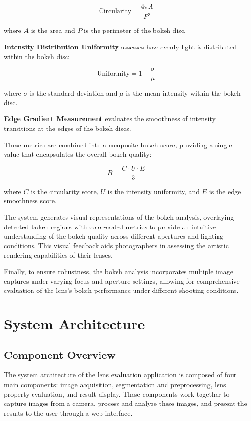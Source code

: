 \begin{equation}
\text{Circularity} = \frac{4\pi A}{P^2}
\end{equation}

where \( A \) is the area and \( P \) is the perimeter of the bokeh disc.

\textbf{Intensity Distribution Uniformity} assesses how evenly light is distributed within the bokeh disc:

\begin{equation}
\text{Uniformity} = 1 - \frac{\sigma}{\mu}
\end{equation}

where \( \sigma \) is the standard deviation and \( \mu \) is the mean intensity within the bokeh disc.

\textbf{Edge Gradient Measurement} evaluates the smoothness of intensity transitions at the edges of the bokeh discs.

These metrics are combined into a composite bokeh score, providing a single value that encapsulates the overall bokeh quality:

\begin{equation}
B = \frac{C \cdot U \cdot E}{3}
\end{equation}

where \( C \) is the circularity score, \( U \) is the intensity uniformity, and \( E \) is the edge smoothness score.

The system generates visual representations of the bokeh analysis, overlaying detected bokeh regions with color-coded metrics to provide an intuitive understanding of the bokeh quality across different apertures and lighting conditions. This visual feedback aids photographers in assessing the artistic rendering capabilities of their lenses.

Finally, to ensure robustness, the bokeh analysis incorporates multiple image captures under varying focus and aperture settings, allowing for comprehensive evaluation of the lens's bokeh performance under different shooting conditions.

\section{System Architecture}

\subsection{Component Overview}
The system architecture of the lens evaluation application is composed of four main components: image acquisition, segmentation and preprocessing, lens property evaluation, and result display. These components work together to capture images from a camera, process and analyze these images, and present the results to the user through a web interface.

